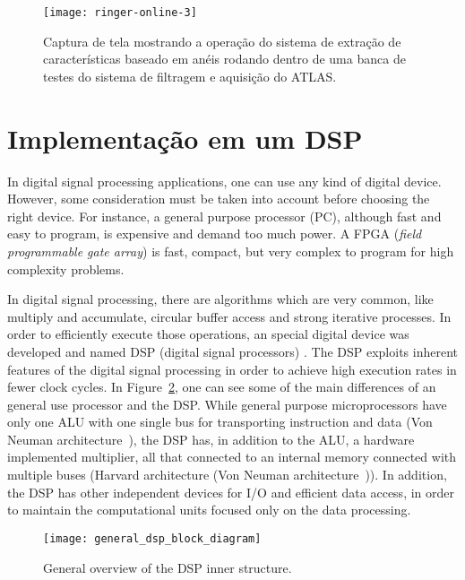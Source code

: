 \begin{figure}
\begin{center}
\texttt{[image: ringer-online-3]}
\end{center}
\caption{Captura de tela mostrando a operação do sistema de extração de
características baseado em anéis rodando dentro de uma banca de testes do
sistema de filtragem e aquisição do ATLAS.}
\label{fig:ringer-screenshot}
\end{figure}

\section{Implementação em um DSP}

In digital signal processing applications, one can use any kind of digital
device. However, some consideration must be taken into account before choosing
the right device. For instance, a general purpose processor (PC), although
fast and easy to program, is expensive and demand too much power. A FPGA
(\emph{field programmable gate array}) \cite{LIVRO_FPGA} is fast, compact, but
very complex to program for high complexity problems.

In digital signal processing, there are algorithms which are very common, like
multiply and accumulate, circular buffer access and strong iterative
processes. In order to efficiently execute those operations, an special
digital device was developed and named DSP (digital signal processors)
\cite{DSP_FIRST}. The DSP exploits inherent features of the digital signal
processing in order to achieve high execution rates in fewer clock cycles. In
Figure~\ref{FIG:DSP_INNER_STRUCTURE}, one can see some of the main differences
of an general use processor and the DSP. While general purpose microprocessors
have only one ALU with one single bus for transporting instruction and data
(Von Neuman architecture~\cite{REAL_TIME_SIGNAL_PROCESSING}), the DSP has, in
addition to the ALU, a hardware implemented multiplier, all that connected to
an internal memory connected with multiple buses (Harvard architecture (Von
Neuman architecture~\cite{REAL_TIME_SIGNAL_PROCESSING})). In addition, the DSP
has other independent devices for I/O and efficient data access, in order to
maintain the computational units focused only on the data processing.

\begin{figure}
\begin{center}
\texttt{[image: general\_dsp\_block\_diagram]}
\caption{General overview of the DSP inner structure.}
\label{FIG:DSP_INNER_STRUCTURE}
\end{center}
\end{figure}

